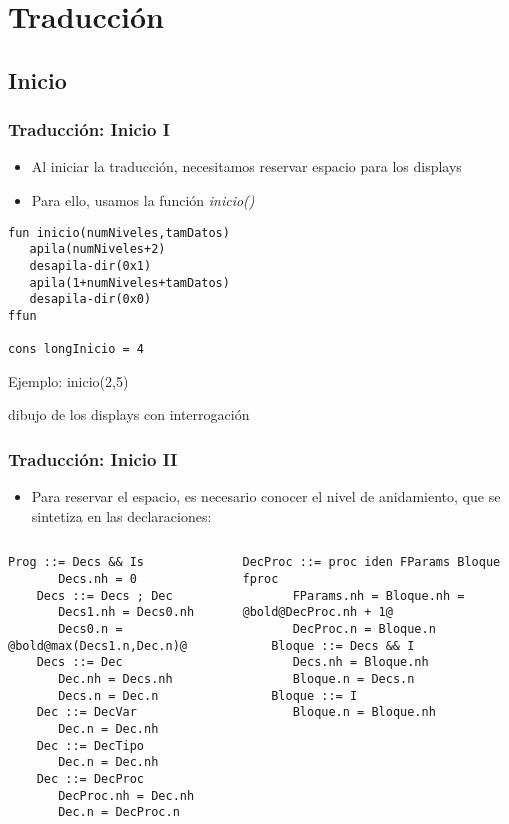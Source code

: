 \documentclass[hyperref={pdfpagelabels=false},tree-dvips,compress]{beamer}
\begin{document}
\section{Traducción}
\subsection{Inicio}
\begin{frame}[fragile]
\frametitle{Traducción: Inicio I}

\begin{itemize}
	\item Al iniciar la traducción, necesitamos reservar espacio para los displays
	\item Para ello, usamos la función \emph{inicio()}
\end{itemize}

\begin{lstlisting}[style=codigoMP,basicstyle=\scriptsize\ttfamily,mathescape]
fun inicio(numNiveles,tamDatos)
   apila(numNiveles+2)
   desapila-dir(0x1)
   apila(1+numNiveles+tamDatos)
   desapila-dir(0x0)
ffun

cons longInicio = 4
\end{lstlisting}

Ejemplo: inicio(2,5)

dibujo de los displays con interrogación

\end{frame}
\begin{frame}[fragile]
\frametitle{Traducción: Inicio II}

\begin{itemize}
	\item Para reservar el espacio, es necesario conocer el nivel de anidamiento, que se sintetiza en las declaraciones:
\end{itemize}

\begin{columns}[T]
	\begin{lstlisting}[style=gramaticas,basicstyle=\scriptsize\ttfamily,mathescape]
	Prog ::= Decs && Is
	   Decs.nh = 0
	Decs ::= Decs ; Dec
	   Decs1.nh = Decs0.nh
	   Decs0.n = @bold@max(Decs1.n,Dec.n)@
	Decs ::= Dec
	   Dec.nh = Decs.nh
	   Decs.n = Dec.n
	Dec ::= DecVar
	   Dec.n = Dec.nh
	Dec ::= DecTipo
	   Dec.n = Dec.nh
	Dec ::= DecProc
	   DecProc.nh = Dec.nh
	   Dec.n = DecProc.n
	\end{lstlisting}

	\begin{lstlisting}[style=gramaticas,basicstyle=\scriptsize\ttfamily,mathescape]
	DecProc ::= proc iden FParams Bloque fproc
	   FParams.nh = Bloque.nh = @bold@DecProc.nh + 1@
	   DecProc.n = Bloque.n
	Bloque ::= Decs && I
	   Decs.nh = Bloque.nh
	   Bloque.n = Decs.n
	Bloque ::= I
	   Bloque.n = Bloque.nh
	\end{lstlisting}
\end{columns}

\end{frame}
\end{document}
